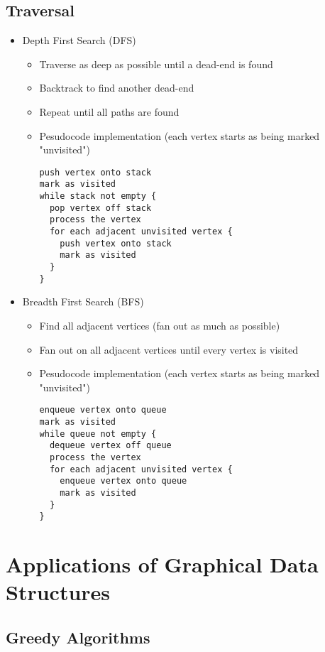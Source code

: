 \subsection*{Traversal}

\begin{itemize}
  \item Depth First Search (DFS)
  \begin{itemize}
    \item Traverse as deep as possible until a dead-end is found
    \item Backtrack to find another dead-end
    \item Repeat until all paths are found
    \item Pesudocode implementation (each vertex starts as being marked "unvisited")
  \begin{verbatim}
push vertex onto stack
mark as visited
while stack not empty {
  pop vertex off stack
  process the vertex
  for each adjacent unvisited vertex {
    push vertex onto stack
    mark as visited
  }
}
  \end{verbatim}
  \end{itemize}
  \item Breadth First Search (BFS)
  \begin{itemize}
    \item Find all adjacent vertices (fan out as much as possible)
    \item Fan out on all adjacent vertices until every vertex is visited
    \item Pesudocode implementation (each vertex starts as being marked "unvisited")
  \begin{verbatim}
enqueue vertex onto queue
mark as visited
while queue not empty {
  dequeue vertex off queue
  process the vertex
  for each adjacent unvisited vertex {
    enqueue vertex onto queue
    mark as visited
  }
}
  \end{verbatim}
  \end{itemize}
\end{itemize}

\section*{Applications of Graphical Data Structures}

\subsection*{Greedy Algorithms}

